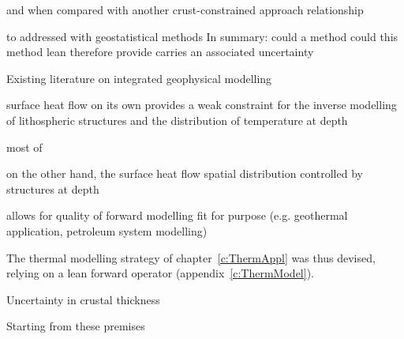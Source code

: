 


and when compared with another crust-constrained approach
relationship



to 
addressed with geostatistical methods
In summary:
could a method
could this method lean
therefore
provide
carries an associated uncertainty

Existing literature on integrated geophysical modelling

surface heat flow on its own provides a weak constraint
for the inverse modelling of lithospheric structures
and the distribution of temperature at depth

most of

on the other hand, the surface heat flow spatial distribution
controlled by structures at depth

allows for
quality of forward modelling
fit for purpose (e.g. geothermal application, petroleum system modelling)

The thermal modelling strategy of chapter~\ref{c:ThermAppl} was thus devised, relying on a lean forward operator (appendix~\ref{c:ThermModel}).

Uncertainty in crustal thickness


Starting from these premises

